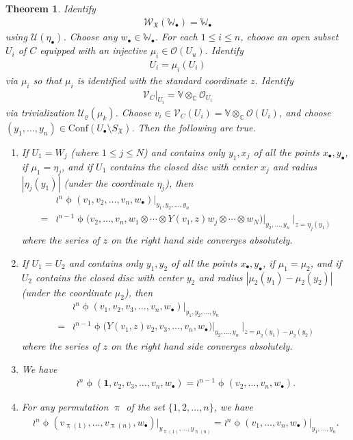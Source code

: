 \documentclass[12pt,a4paper,notitlepage]{article}
\theoremstyle{definition}
\theoremstyle{plain}
\newtheorem{thm}[df]{Theorem}
\newcommand{\fk}{\mathfrak}
\newcommand{\mc}{\mathcal}
\newcommand{\id}{\mathbf{1}}
\newcommand{\Conf}{\mathrm{Conf}}
\newcommand{\scr}{\mathscr}
\newcommand{\SX}{{S_{\fk X}}}
\newcommand{\blt}{\bullet}
\newcommand{\Vbb}{\mathbb V}
\newcommand{\Wbb}{\mathbb W}
\newcommand{\Cbb}{\mathbb C}
\numberwithin{equation}{section}
\begin{document}
\begin{thm}\label{lb17}
Identify
\begin{align*}
\scr W_{\fk X}(\Wbb_\blt)=\Wbb_\blt	
\end{align*}
using $\mc U(\eta_\blt)$. Choose any $w_\blt\in\Wbb_\blt$. For each $1\leq i\leq n$, choose an open subset  $U_i$  of $C$ equipped with an injective $\mu_i\in\scr O(U_u)$. Identify 
\begin{align*}
U_i=\mu_i(U_i)	
\end{align*}
via $\mu_i$ so that $\mu_i$ is identified with the standard coordinate $z$. Identify 
\begin{align*}
\scr V_C\big|_{U_i}=\Vbb\otimes_\Cbb\scr O_{U_i}	
\end{align*}
via trivialization $\mc U_\varrho(\mu_k)$.  Choose $v_i\in\scr V_C(U_i)=\Vbb\otimes_\Cbb\scr O(U_i)$, and choose $(y_1,\dots,y_n)\in\Conf(U_\blt\setminus\SX)$. Then the following are true.
\begin{enumerate}[label=(\arabic*)]
\item If $U_1=W_j$ (where $1\leq j\leq N$) and contains only $y_1,x_j$ of all the points $x_\blt,y_\blt$, if $\mu_1=\eta_j$, and if $U_1$ contains the closed disc with center $x_j$ and radius $|\eta_j(y_1)|$ (under the coordinate $\eta_j$), then
\begin{align}
&\wr^n\upphi(v_1,v_2,\dots,v_n,w_\blt)\big|_{y_1,y_2,\dots,y_n}\nonumber\\
=&\wr^{n-1}\upphi\big(v_2,\dots,v_n,w_1\otimes\cdots\otimes Y(v_1,z)w_j\otimes\cdots\otimes w_N\big)\big|_{y_2,\dots,y_n}~\big|_{z=\eta_j(y_1)}\label{eq35}
\end{align}
where the series of $z$ on the right hand side converges absolutely.
\item If $U_1=U_2$ and contains only $y_1,y_2$ of all the  points $x_\blt,y_\blt$, if $\mu_1=\mu_2$, and if $U_2$ contains the closed disc with center $y_2$ and radius $|\mu_2(y_1)-\mu_2(y_2)|$ (under the coordinate $\mu_2$), then
\begin{align}
&\wr^n\upphi(v_1,v_2,v_3,\dots,v_n,w_\blt)\big|_{y_1,y_2,\dots,y_n}\nonumber\\
=&\wr^{n-1}\upphi\big(Y(v_1,z)v_2,v_3,\dots,v_n,w_\blt\big)\big |_{y_2,\dots,y_n}~\big |_{z=\mu_2(y_1)-\mu_2(y_2)}\label{eq36}
\end{align}
where the series of $z$ on the right hand side converges absolutely.
\item  We have
\begin{align}
\wr^n\upphi(\id,v_2,v_3,\dots,v_n,w_\blt)=\wr^{n-1}\upphi(v_2,\dots,v_n,w_\blt).
\end{align}
\item For any permutation $\uppi$ of the set $\{1,2,\dots,n\}$, we have
\begin{align}
\wr^n\upphi(v_{\uppi(1)},\dots,v_{\uppi(n)},w_\blt)\big|_{y_{\uppi(1)},\dots,y_{\uppi(n)}}=\wr^n\upphi(v_1,\dots,v_n,w_\blt)\big|_{y_1,\dots,y_n}.
\end{align}
\end{enumerate}
\end{thm}
\end{document}
